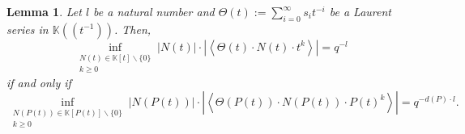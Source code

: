 \documentclass{article}
\newtheorem{lemma}[theorem]{Lemma}
\theoremstyle{definition}
\newcommand{\K}{\mathbb{K}}
\numberwithin{equation}{subsection}
\begin{document}
   \begin{lemma}
   \label{lemma4} Let $l$ be a natural number and $\Theta(t):=\sum_{i=0}^\infty s_it^{-i}$ be a Laurent series in $\K\!\left(\!\left(t^{-1}\right)\!\right)$. Then,\begin{equation}     \inf_{\substack{N(t)\in\K[t]\backslash\{0\}\\k\ge0}} |N(t)|\cdot\left|\left\langle\Theta(t)\cdot N(t) \cdot t^k\right\rangle\right|=q^{-l} \label{inf2}
   \end{equation} if and only if \begin{equation}
       \inf_{\substack{N(P(t))\in\K[P(t)]\backslash\{0\}\\k\ge0}} |N(P(t))|\cdot\left|\left\langle\Theta(P(t))\cdot N(P(t)) \cdot P(t)^k\right\rangle\right|=q^{-d(P)\cdot l}.\label{inf5}
   \end{equation} 
\end{lemma}
\end{document}
